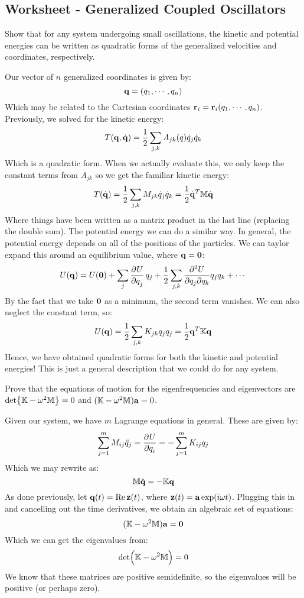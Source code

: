 \subsection{Worksheet - Generalized Coupled Oscillators}
\begin{p}
Show that for any system undergoing small oscillations, the kinetic and potential energies can be written as quadratic forms of the generalized velocities and coordinates, respectively.
\end{p}
\begin{s}
Our vector of $n$ generalized coordinates is given by:
\[\mathbf{q} = (q_1, \cdots, q_n)\]
Which may be related to the Cartesian coordinates $\mathbf{r}_i = \mathbf{r}_i(q_1, \cdots, q_n)$. Previously, we solved for the kinetic energy:
\[T(\mathbf{q}, \dot{\mathbf{q}}) = \frac{1}{2}\sum_{j,k}A_{jk}(q) \dot{q}_j\dot{q}_k\]
Which is a quadratic form. When we actually evaluate this, we only keep the constant terms from $A_{jk}$ so we get the familiar kinetic energy:
\[T(\dot{\mathbf{q}}) = \frac{1}{2}\sum_{j,k}M_{jk}\dot{q}_j\dot{q}_k = \frac{1}{2}\dot{\mathbf{q}}^T\mathbb{M}\dot{\mathbf{q}}\]
Where things have been written as a matrix product in the last line (replacing the double sum). The potential energy we can do a similar way. In general, the potential energy depends on all of the positions of the particles. We can taylor expand this around an equilibrium value, where $\mathbf{q} = \mathbf{0}$:
\[U(\v{q}) = U(\v{0}) + \sum_j \dpd{U}{q_j}q_j + \frac{1}{2}\sum_{j,k}\frac{\partial^2 U}{\partial q_j\partial q_k}q_jq_k + \cdots\]
By the fact that we take $\mathbf{0}$ as a minimum, the second term vanishes. We can also neglect the constant term, so:
\[U(\mathbf{q}) = \frac{1}{2}\sum_{j, k}K_{jk}q_jq_j = \frac{1}{2}\mathbf{q}^T\mathbb{K}\mathbf{q}\]
Hence, we have obtained quadratic forms for both the kinetic and potential energies! This is just a general description that we could do for any system.
\end{s}

\begin{p}
Prove that the equations of motion for the eigenfrequencies and eigenvectors are $\det{\mathbb{K}- \omega^2\mathbb{M}} = 0$ and $(\mathbb{K} - \omega^2\mathbb{M})\mathbf{a} = 0$.
\end{p}
\begin{s}
Given our system, we have $m$ Lagrange equations in general. These are given by:
\[\sum_{j=1}^mM_{ij}\ddot{q}_j = \dpd{U}{q_i} = -\sum_{j=1}^m K_{ij}q_j\]
Which we may rewrite as:
\[\mathbb{M}\ddot{\mathbf{q}} = -\mathbb{K}\mathbf{q}\]
As done previously, let $\mathbf{q}(t) = \Re\mathbf{z}(t)$, where $\mathbf{z}(t) = \mathbf{a}\exp(i\omega t)$. Plugging this in and cancelling out the time derivatives, we obtain an algebraic set of equations:
\[(\mathbb{K} - \omega^2\mathbb{M})\mathbf{a} = \mathbf{0}\]
Which we can get the eigenvalues from:
\[\det(\mathbb{K} - \omega^2\mathbb{M}) = 0\]
We know that these matrices are positive semidefinite, so the eigenvalues will be positive (or perhaps zero).
\end{s}


